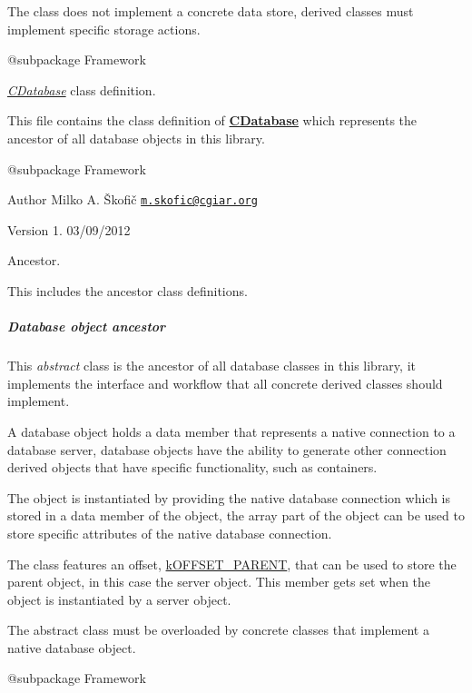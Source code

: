 The class does not implement a concrete data store, derived classes must implement specific storage actions.

\begin{DoxyVerb} @subpackage        Framework\end{DoxyVerb}


{\itshape \hyperlink{class_c_database}{C\-Database}} class definition.

This file contains the class definition of {\bfseries \hyperlink{class_c_database}{C\-Database}} which represents the ancestor of all database objects in this library.

\begin{DoxyVerb} @subpackage        Framework
\end{DoxyVerb}


\begin{DoxyAuthor}{Author}
Milko A. Škofič \href{mailto:m.skofic@cgiar.org}{\tt m.\-skofic@cgiar.\-org} 
\end{DoxyAuthor}
\begin{DoxyVersion}{Version}
1. 03/09/2012
\end{DoxyVersion}
Ancestor.

This includes the ancestor class definitions. \subparagraph*{Database object ancestor}

This {\itshape abstract} class is the ancestor of all database classes in this library, it implements the interface and workflow that all concrete derived classes should implement.

A database object holds a data member that represents a native connection to a database server, database objects have the ability to generate other connection derived objects that have specific functionality, such as containers.

The object is instantiated by providing the native database connection which is stored in a data member of the object, the array part of the object can be used to store specific attributes of the native database connection.

The class features an offset, \hyperlink{}{k\-O\-F\-F\-S\-E\-T\-\_\-\-P\-A\-R\-E\-N\-T}, that can be used to store the parent object, in this case the server object. This member gets set when the object is instantiated by a server object.

The abstract class must be overloaded by concrete classes that implement a native database object.

\begin{DoxyVerb} @subpackage        Framework\end{DoxyVerb}


